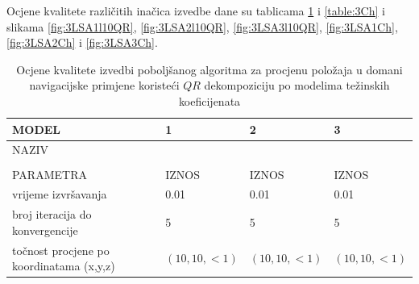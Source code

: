 \documentclass[a4paper,twoside,12pt]{memoir} %
\begin{document}
Ocjene kvalitete različitih inačica izvedbe dane su tablicama \ref{table:3QR} i \ref{table:3Ch} i slikama \ref{fig:3LSA1l10QR}, \ref{fig:3LSA2l10QR}, \ref{fig:3LSA3l10QR}, \ref{fig:3LSA1Ch}, \ref{fig:3LSA2Ch} i \ref{fig:3LSA3Ch}.%
\begin{table}[H]
	\caption{Ocjene kvalitete izvedbi poboljšanog algoritma za procjenu položaja u domani navigacijske primjene koristeći $QR$ dekompoziciju po modelima težinskih koeficijenata}
	\begin{center}
		\begin{tabular}{||p{3cm}|p{3.1cm}||p{3.1cm}||p{3.1cm}|}
			\hline
			\cellcolor{lightgray} MODEL & 1 & 2 & 3\\
			\hline
			\hline
			\rowcolor{lightgray}NAZIV&   &   &   \\
			\rowcolor{lightgray}&   &   &   \\
			\multirow{-3}{0.5cm}{ \cellcolor{lightgray}PARAMETRA} & \multirow{-3}{0.5cm}{\cellcolor{lightgray}IZNOS} & \multirow{-3}{0.5cm}{\cellcolor{lightgray}IZNOS} & \multirow{-3}{0.5cm}{\cellcolor{lightgray}IZNOS} 
			\\
			\hline
			\vspace{0.1cm}
			vrijeme izvršavanja & \vspace{0.1cm}  0.01 & \vspace{0.1cm} 0.01 &\vspace{0.1cm} 0.01\\
			\vspace{0.1cm}
			broj iteracija do konvergencije &\vspace{0.1cm} 5 &\vspace{0.1cm} 5 &\vspace{0.1cm} 5 \\
			\vspace{0.1cm}
			točnost procjene po koordinatama (x,y,z) & \vspace{0.1cm} $(10,10, < 1)$ &\vspace{0.1cm} $(10,10, < 1)$ &\vspace{0.1cm} $(10,10, < 1)$ \\
			\hline 
		\end{tabular}
	\end{center}
	\label{table:3QR}
\end{table}
\end{document}
